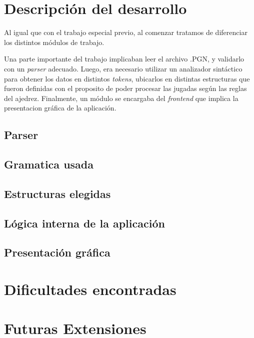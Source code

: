 \documentclass[a4paper,10pt]{article}
\begin{document}
\newpage

\section{Descripción del desarrollo}
    Al igual que con el trabajo especial previo, al comenzar tratamos de diferenciar los distintos módulos de trabajo. 

 Una parte importante del trabajo implicaban leer el archivo .PGN, y validarlo con un \textit{parser} adecuado.
Luego, era necesario utilizar un analizador sintáctico para obtener los datos en distintos \textit{tokens}, ubicarlos en distintas
estructuras que fueron definidas con el proposito de poder procesar las jugadas según las reglas del ajedrez.
Finalmente, un módulo se encargaba del \textit{frontend} que implica la presentacion gráfica de la aplicación.

\subsection{Parser}

\subsection{Gramatica usada}

\subsection{Estructuras elegidas}

\subsection{Lógica interna de la aplicación}

\subsection{Presentación gráfica}

\newpage

\section{Dificultades encontradas}
\newpage

\section{Futuras Extensiones}
   
\end{document}
